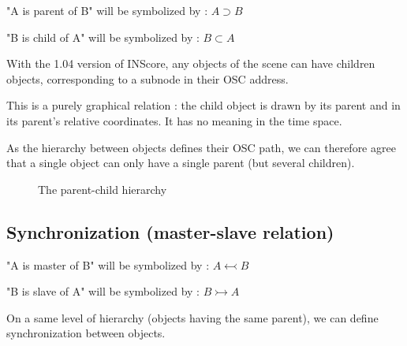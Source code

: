 \documentclass[a4paper]{article}
\begin{document}
"A is parent of B" will be symbolized by : $A \supset B$

"B is child of A" will be symbolized by : $B \subset A$

\bigskip

With the 1.04 version of INScore, any objects of the scene can have children objects, corresponding to a subnode in their OSC address. 

This is a purely graphical relation : the child object is drawn by its parent and in its parent's relative coordinates. It has no meaning in the time space. 

As the hierarchy between objects defines their OSC path, we can therefore agree that a single object can only have a single parent (but several children). 

\bigskip

\begin{figure}[h]


 \caption{The parent-child hierarchy}
 \label{fig:hierarchy}

\end{figure}

\subsection{Synchronization (master-slave relation)}\label{subsec:sync}

"A is master of B" will be symbolized by : $A \leftarrowtail B$

"B is slave of A" will be symbolized by : $B \rightarrowtail A$
\bigskip

On a same level of hierarchy (objects having the same parent), we can define synchronization between objects. 
\end{document}
